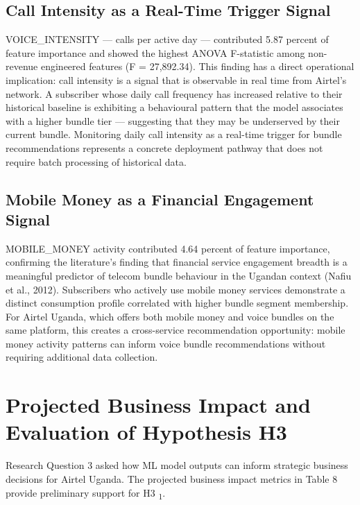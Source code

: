 \subsection{Call Intensity as a Real-Time Trigger Signal}

VOICE\_INTENSITY --- calls per active day --- contributed 5.87 percent of feature importance and showed the highest ANOVA F-statistic among non-revenue engineered features (F = 27,892.34). This finding has a direct operational implication: call intensity is a signal that is observable in real time from Airtel's network. A subscriber whose daily call frequency has increased relative to their historical baseline is exhibiting a behavioural pattern that the model associates with a higher bundle tier --- suggesting that they may be underserved by their current bundle. Monitoring daily call intensity as a real-time trigger for bundle recommendations represents a concrete deployment pathway that does not require batch processing of historical data.


\subsection{Mobile Money as a Financial Engagement Signal}

MOBILE\_MONEY activity contributed 4.64 percent of feature importance, confirming the literature's finding that financial service engagement breadth is a meaningful predictor of telecom bundle behaviour in the Ugandan context (Nafiu et al., 2012). Subscribers who actively use mobile money services demonstrate a distinct consumption profile correlated with higher bundle segment membership. For Airtel Uganda, which offers both mobile money and voice bundles on the same platform, this creates a cross-service recommendation opportunity: mobile money activity patterns can inform voice bundle recommendations without requiring additional data collection.


\section{Projected Business Impact and Evaluation of Hypothesis H3}

Research Question 3 asked how ML model outputs can inform strategic business decisions for Airtel Uganda. The projected business impact metrics in Table 8 provide preliminary support for H3	\textsubscript{1}.

